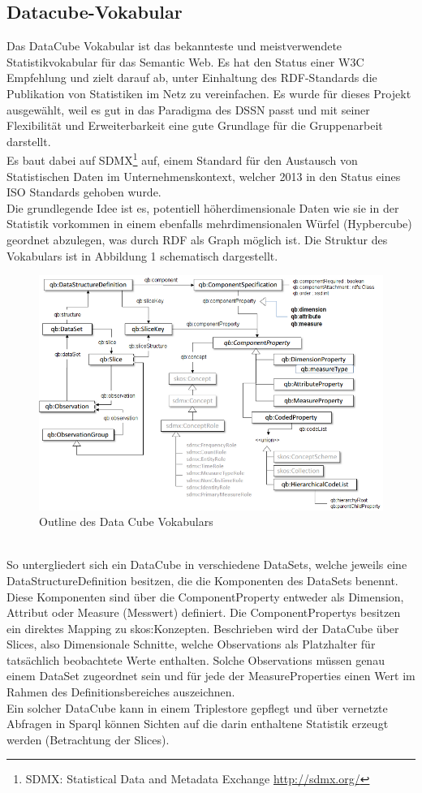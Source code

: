 \documentclass{article}
\begin{document}
\subsection{Datacube-Vokabular}

Das DataCube Vokabular ist das bekannteste und meistverwendete Statistikvokabular für das Semantic Web. Es hat den Status einer W3C Empfehlung\cite{datacube} und zielt darauf ab, unter Einhaltung des RDF-Standards die Publikation von Statistiken im Netz zu vereinfachen. Es wurde für dieses Projekt ausgewählt, weil es gut in das Paradigma des DSSN passt und mit seiner Flexibilität und Erweiterbarkeit eine gute Grundlage für die Gruppenarbeit darstellt.\\
Es baut dabei auf SDMX\footnote{SDMX: Statistical Data and Metadata Exchange \url{http://sdmx.org/}} auf, einem Standard für den Austausch von Statistischen Daten im Unternehmenskontext, welcher 2013 in den Status eines ISO Standards\cite{iso} gehoben wurde.\\
Die grundlegende Idee ist es, potentiell höherdimensionale Daten wie sie in der Statistik vorkommen in einem ebenfalls mehrdimensionalen Würfel (Hypbercube) geordnet abzulegen, was durch RDF als Graph möglich ist. Die Struktur des Vokabulars ist in Abbildung 1 schematisch dargestellt.
\begin{figure}[t]
\centering
\includegraphics[width=\textwidth]{qb-fig1.png}
\caption{Outline des Data Cube Vokabulars}
\label{fig:my_label}
\end{figure}\\
So untergliedert sich ein DataCube in verschiedene DataSets, welche jeweils eine DataStructureDefinition besitzen, die die Komponenten des DataSets benennt. Diese Komponenten sind über die ComponentProperty entweder als Dimension, Attribut oder Measure (Messwert) definiert. Die ComponentPropertys besitzen ein direktes Mapping zu skos:Konzepten. Beschrieben wird der DataCube über Slices, also Dimensionale Schnitte, welche Observations als Platzhalter für tatsächlich beobachtete Werte enthalten. Solche Observations müssen genau einem DataSet zugeordnet sein und für jede der MeasureProperties einen Wert im Rahmen des Definitionsbereiches auszeichnen.\\
Ein solcher DataCube kann in einem Triplestore gepflegt und über vernetzte Abfragen in Sparql können Sichten auf die darin enthaltene Statistik erzeugt werden (Betrachtung der Slices).
\end{document}

